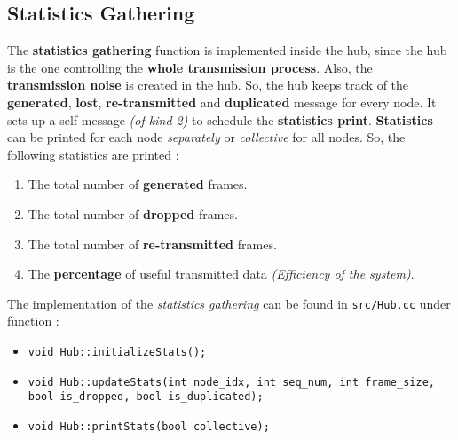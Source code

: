 \subsection{Statistics Gathering}
The \textbf{statistics gathering} function is implemented inside the hub, since the hub is the one controlling the \textbf{whole transmission process}. Also, the \textbf{transmission noise} is created in the hub. So, the hub keeps track of the \textbf{generated}, \textbf{lost}, \textbf{re-transmitted} and \textbf{duplicated} message for every node. It sets up a self-message \emph{(of kind 2)} to schedule the \textbf{statistics print}. \textbf{Statistics} can be printed for each node \emph{separately} or \emph{collective} for all nodes. So, the following statistics are printed :
\begin{enumerate}
    \item The total number of \textbf{generated} frames.
    \item The total number of \textbf{dropped} frames.
    \item The total number of \textbf{re-transmitted} frames.
    \item The \textbf{percentage} of useful transmitted data \emph{(Efficiency of the system)}.
\end{enumerate}

The implementation of the \emph{statistics gathering} can be found in \texttt{src/Hub.cc} under function :
\begin{itemize}
    \item \texttt{void Hub::initializeStats();}
    \item \texttt{void Hub::updateStats(int node\_idx, int seq\_num, int frame\_size, bool is\_dropped, bool is\_duplicated);}
    \item \texttt{void Hub::printStats(bool collective);}
\end{itemize}

